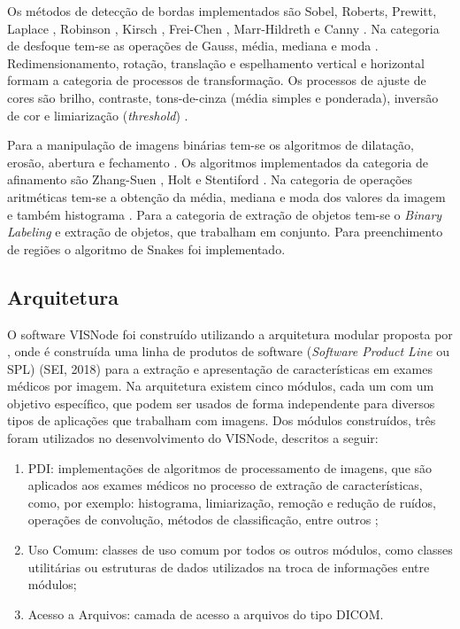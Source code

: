 \documentclass[
	12pt,				%
	oneside,			%
	a4paper,			%
	english,			%
	french,				%
	spanish,			%
	brazil,				%
	]{abntex2}
\begin{document}
Os métodos de detecção de bordas implementados são Sobel, Roberts, Prewitt, Laplace \cite{gonzalesWoods:2008}, Robinson \cite{robinson1977edge}, Kirsch \cite{kirsch1971computer}, Frei-Chen \cite{chen1977fast}, Marr-Hildreth \cite{marr1980theory} e Canny \cite{canny:1986}. Na categoria de desfoque tem-se as operações de Gauss, média, mediana e moda \cite{gonzalesWoods:2008}. Redimensionamento, rotação, translação e espelhamento vertical e horizontal \cite{gonzalesWoods:2008} formam a categoria de processos de transformação. Os processos de ajuste de cores são brilho, contraste, tons-de-cinza (média simples e ponderada), inversão de cor e limiarização (\textit{threshold})  \cite{gonzalesWoods:2008}. 

Para a manipulação de imagens binárias tem-se os algoritmos de dilatação, erosão, abertura e fechamento \cite{gonzalesWoods:2008}. Os algoritmos implementados da categoria de afinamento são Zhang-Suen \cite{zhang1984fast}, Holt \cite{holt1987improved} e Stentiford \cite{stentiford1983some}. Na categoria de operações aritméticas tem-se a obtenção da média, mediana e moda dos valores da imagem e também histograma \cite{gonzalesWoods:2008}. Para a categoria de extração de objetos tem-se o \textit{Binary Labeling} \cite{gonzalesWoods:2008} e extração de objetos, que trabalham em conjunto. Para preenchimento de regiões o algoritmo de Snakes \cite{kass:1988} foi implementado.


\subsection{Arquitetura}

O software VISNode foi construído utilizando a arquitetura modular proposta por \citet{reisferramenta}, onde é construída uma linha de produtos de software (\textit{Software Product Line} ou SPL) (SEI, 2018)  para a extração e apresentação de características em exames médicos por imagem. Na arquitetura existem cinco módulos, cada um com um objetivo específico, que podem ser usados de forma independente para diversos tipos de aplicações que trabalham com imagens. Dos módulos construídos, três foram utilizados no desenvolvimento do VISNode, descritos a seguir:

\begin{enumerate}
\item PDI: implementações de algoritmos de processamento de imagens, que são aplicados aos exames médicos no processo de extração de características, como, por exemplo: histograma, limiarização, remoção e redução de ruídos, operações de convolução, métodos de classificação, entre outros \cite{reisferramenta}; 
\item Uso Comum: classes de uso  comum  por todos os outros módulos, como classes utilitárias ou estruturas de dados utilizados na troca de informações entre módulos; 
\item Acesso a Arquivos: camada de acesso a arquivos do tipo DICOM.
\end{enumerate}
\end{document}
